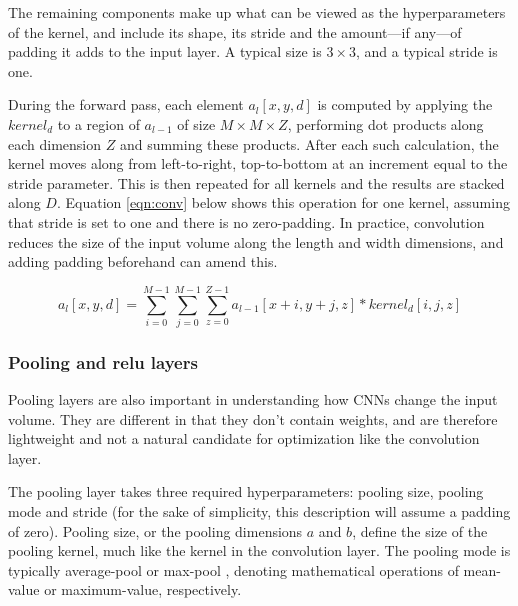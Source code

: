 
The remaining components make up what can be viewed as the hyperparameters of the kernel, and include its shape, its stride and the amount---if any---of padding it adds to the input layer. A typical size is $3\times3$, and a typical stride is one.

During the forward pass, each element $a_{l}[x,y,d]$ is computed by applying the $kernel_{d}$ to a region of $a_{l-1}$ of size $M\times M\times Z$, performing dot products along each dimension $Z$ and summing these products. After each such calculation, the kernel moves along from left-to-right, top-to-bottom at an increment equal to the stride parameter. This is then repeated for all kernels and the results are stacked along $D$. Equation \ref{eqn:conv} below shows this operation for one kernel, assuming that stride is set to one and there is no zero-padding. In practice, convolution reduces the size of the input volume along the length and width dimensions, and adding padding beforehand can amend this.

\begin{equation}
\label{eqn:conv}
a_{l}[x,y,d] = \sum_{i=0}^{M-1}\sum_{j=0}^{M-1}\sum_{z=0}^{Z-1}{a_{l-1}[x+i,y+j,z] * kernel_{d}[i,j,z]}
\end{equation}

\subsubsection{Pooling and relu layers}
Pooling layers are also important in understanding how CNNs change the input volume. They are different in that they don't contain weights, and are therefore lightweight and not a natural candidate for optimization like the convolution layer.

The pooling layer takes three required hyperparameters: pooling size, pooling mode and stride (for the sake of simplicity, this description will assume a padding of zero). Pooling size, or the pooling dimensions $a$ and $b$, define the size of the pooling kernel, much like the kernel in the convolution layer. The pooling mode is typically average-pool or max-pool \cite{convnets}, denoting mathematical operations of mean-value or maximum-value, respectively.

